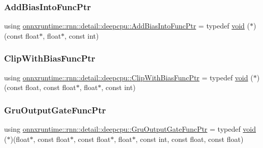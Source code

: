 \subsubsection{\texorpdfstring{Add\+Bias\+Into\+Func\+Ptr}{AddBiasIntoFuncPtr}}
{\footnotesize\ttfamily using \mbox{\hyperlink{namespaceonnxruntime_1_1rnn_1_1detail_1_1deepcpu_a8b1f80ae5020b2ff8e057c5aa8180c28}{onnxruntime\+::rnn\+::detail\+::deepcpu\+::\+Add\+Bias\+Into\+Func\+Ptr}} = typedef \mbox{\hyperlink{mlasi_8h_a88f941d423cb2a819b70a1358982b1a6}{void}} ($\ast$)(const float$\ast$, float$\ast$, const int)}

\mbox{\label{namespaceonnxruntime_1_1rnn_1_1detail_1_1deepcpu_ae72a03e6191d492760e3d7b02f470564}} 
\subsubsection{\texorpdfstring{Clip\+With\+Bias\+Func\+Ptr}{ClipWithBiasFuncPtr}}
{\footnotesize\ttfamily using \mbox{\hyperlink{namespaceonnxruntime_1_1rnn_1_1detail_1_1deepcpu_ae72a03e6191d492760e3d7b02f470564}{onnxruntime\+::rnn\+::detail\+::deepcpu\+::\+Clip\+With\+Bias\+Func\+Ptr}} = typedef \mbox{\hyperlink{mlasi_8h_a88f941d423cb2a819b70a1358982b1a6}{void}} ($\ast$)(const float, const float$\ast$, float$\ast$, const int)}

\mbox{\label{namespaceonnxruntime_1_1rnn_1_1detail_1_1deepcpu_a36e4209baa17c6f915ca2c8ea476decc}} 
\subsubsection{\texorpdfstring{Gru\+Output\+Gate\+Func\+Ptr}{GruOutputGateFuncPtr}}
{\footnotesize\ttfamily using \mbox{\hyperlink{namespaceonnxruntime_1_1rnn_1_1detail_1_1deepcpu_a36e4209baa17c6f915ca2c8ea476decc}{onnxruntime\+::rnn\+::detail\+::deepcpu\+::\+Gru\+Output\+Gate\+Func\+Ptr}} = typedef \mbox{\hyperlink{mlasi_8h_a88f941d423cb2a819b70a1358982b1a6}{void}} ($\ast$)(float$\ast$, const float$\ast$, const float$\ast$, float$\ast$, const int, const float, const float)}

